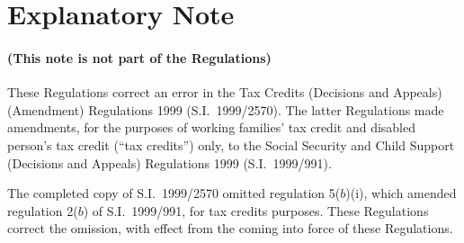 \documentclass[12pt,a4paper]{article}
\begin{document}
\part{Explanatory Note}

\renewcommand\parthead{— Explanatory Note}

\subsection*{(This note is not part of the Regulations)}

These Regulations correct an error in the Tax Credits (Decisions and Appeals) (Amendment) Regulations 1999 (S.I.\ 1999/2570). The latter Regulations made amendments, for the purposes of working families' tax credit and disabled person’s tax credit (“tax credits”) only, to the Social Security and Child Support (Decisions and Appeals) Regulations 1999 (S.I.\ 1999/991).

The completed copy of S.I.\ 1999/2570 omitted regulation 5($b$)(i), which amended regulation 2($b$)  of S.I.\ 1999/991, for tax credits purposes. These Regulations correct the omission, with effect from the coming into force of these Regulations. 
\end{document}
